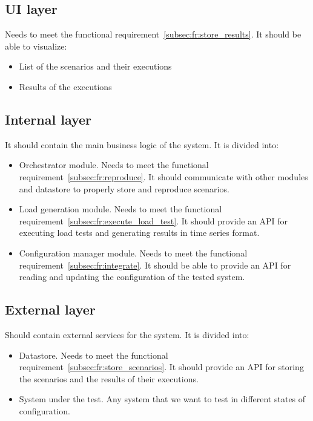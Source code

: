 \subsection{UI layer}\label{subsec:ui_layer}
Needs to meet the functional requirement~\ref{subsec:fr:store_results}.
It should be able to visualize:
\begin{itemize}
    \item List of the scenarios and their executions
    \item Results of the executions
\end{itemize}

\subsection{Internal layer}\label{subsec:internal_layer}
It should contain the main business logic of the system. It is divided into:
\begin{itemize}
    \item Orchestrator module. Needs to meet the functional requirement~\ref{subsec:fr:reproduce}. It should communicate with other modules and datastore to properly store and reproduce scenarios.
    \item Load generation module. Needs to meet the functional requirement~\ref{subsec:fr:execute_load_test}. It should provide an API for executing load tests and generating results in time series format.
    \item Configuration manager module. Needs to meet the functional requirement~\ref{subsec:fr:integrate}. It should be able to provide an API for reading and updating the configuration of the tested system.
\end{itemize}

\subsection{External layer}\label{subsec:external_layer}
Should contain external services for the system. It is divided into:
\begin{itemize}
    \item Datastore. Needs to meet the functional requirement~\ref{subsec:fr:store_scenarios}. It should provide an API for storing the scenarios and the results of their executions.
    \item System under the test. Any system that we want to test in different states of configuration.
\end{itemize}
